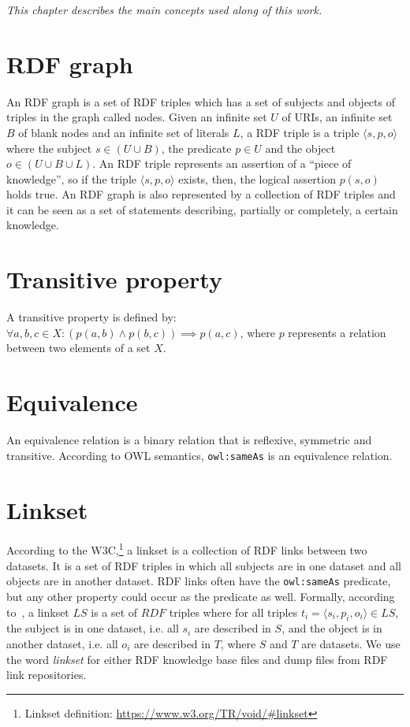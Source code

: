 \textit{This chapter describes the main concepts used along of this work.}

\section{RDF graph} 
An RDF graph is a set of RDF triples which has a set of subjects and objects of triples in the graph called nodes.
Given an infinite set $U$ of URIs, an infinite set $B$ of blank nodes and an infinite set of literals $L$, a RDF triple is a triple $\langle s, p, o \rangle$ where the subject $s \in (U \cup B)$, the predicate $p \in U$ and the object $o \in (U \cup B \cup L)$. An RDF triple represents an assertion of a ``piece of knowledge'', so if the triple $\langle s, p, o \rangle$ exists, then,  the logical assertion $p(s,o)$ holds true.
An RDF graph is also represented by a collection of RDF triples and it can be seen as a set of statements describing, partially or completely, a certain knowledge.

\section{Transitive property} 
A transitive property is defined by: $\forall a,b,c \in X: (p(a,b) \wedge p(b,c)) \implies p(a,c)$, where $p$ represents a relation between two elements of a set $X$.


\section{Equivalence} 
An equivalence relation is a binary relation that is reflexive, symmetric and transitive. According to OWL semantics, \texttt{owl:sameAs} is an equivalence relation.

\section{Linkset}
According to the W3C,\footnote{Linkset definition: \url{https://www.w3.org/TR/void/\#linkset}} a linkset is a collection of RDF links between two datasets. It is a set of RDF triples in which all subjects are in one dataset and all objects are in another dataset. RDF links often have the \texttt{owl:sameAs} predicate, but any other property could occur as the predicate as well.
Formally, according to~\cite{alexander2009describing}, a linkset $LS$ is a set of $RDF$ triples where for all triples $t_i =  \langle s_i, p_i, o_i \rangle \in LS$,  the subject is in one dataset,  i.e. all $s_i$ are described in $S$, and the object is in another dataset, i.e. all $o_i$ are described in $T$, where $S$ and $T$ are datasets.
We use the word \emph{linkset} for either RDF knowledge base files and dump files from RDF link repositories.

